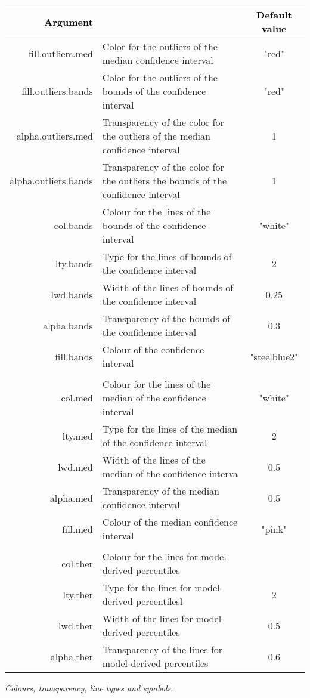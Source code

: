 \begin{table}[!h] 
\begin{center}
\begin{tabular}{| r p{8cm} c|}
\hline
\textbf{\textcolor{black}{Argument}} & \centering{\textbf{\textcolor{black}{Description }}} & \textbf{\textcolor{black}{Default value}} \\
\hline
{\ttfamily fill.outliers.med} & Color for the outliers of the median confidence interval & "red"  \\
{\ttfamily fill.outliers.bands} & Color for the outliers of  the bounds of the confidence interval & "red"  \\
{\ttfamily alpha.outliers.med} & Transparency of the color for the outliers of the median confidence interval & 1  \\
{\ttfamily alpha.outliers.bands} & Transparency of the color  for the outliers the bounds of the confidence interval & 1  \\
{\ttfamily col.bands} &  Colour for the lines of the bounds of the confidence interval & "white"  \\
{\ttfamily lty.bands} &  Type for the lines of bounds of the confidence interval & 2  \\
{\ttfamily lwd.bands} &  Width of the lines of bounds of the confidence interval & 0.25  \\
{\ttfamily alpha.bands} &  Transparency of the bounds of the confidence interval & 0.3  \\
{\ttfamily fill.bands} &  Colour of the confidence interval & "steelblue2"  \\
{\ttfamily } & &  \\
{\ttfamily col.med} &  Colour for the lines of the median of the confidence interval & "white"  \\
{\ttfamily lty.med} &  Type for the lines of the median
of the confidence interval & 2  \\
{\ttfamily lwd.med} &  Width of the lines of the median
of the confidence interva & 0.5  \\
{\ttfamily alpha.med} &  Transparency of the median confidence interval & 0.5  \\
{\ttfamily fill.med} &  Colour of the median confidence  interval & "pink"  \\
{\ttfamily } & &  \\
{\ttfamily col.ther} &  Colour for the lines for model-derived percentiles &  \\
{\ttfamily lty.ther} &  Type for the lines for model-derived percentilesl & 2  \\
{\ttfamily lwd.ther} &  Width of the lines for model-derived percentiles & 0.5  \\
{\ttfamily alpha.ther} &  Transparency of the lines for model-derived percentiles & 0.6  \\
\hline
\end{tabular} 
\end{center}
 {\itshape Colours, transparency, line types and symbols.} %
\end{table} 
